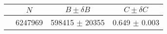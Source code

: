 \begin{tabular}{lccc}
\hline
    &   $N$   & $B \pm \delta B$  &  $C \pm \delta C$ \\
\hline
                               & 6247969    & 598415     $\pm$ 20355 & 0.649      $\pm$ 0.003 \\
\hline
\end{tabular}
